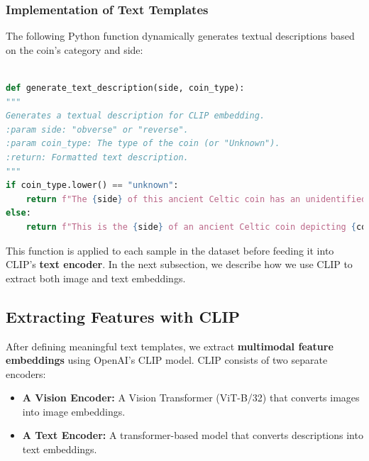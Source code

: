 \documentclass[nolibertine, english, algorithm, nomencl, minted]{ttlab-qualify}
\begin{document}
\subsubsection{Implementation of Text Templates}

The following Python function dynamically generates textual descriptions based on the coin’s category and side:

\begin{footnotesize}
\begin{center}
\begin{tcolorbox}[colback=gray!10, colframe=black, arc=5mm]
\begin{lstlisting}[language=Python, breaklines=true]

def generate_text_description(side, coin_type):
"""
Generates a textual description for CLIP embedding.
:param side: "obverse" or "reverse".
:param coin_type: The type of the coin (or "Unknown").
:return: Formatted text description.
"""
if coin_type.lower() == "unknown":
    return f"The {side} of this ancient Celtic coin has an unidentified design."
else:
    return f"This is the {side} of an ancient Celtic coin depicting {coin_type}."

\end{lstlisting}
\end{tcolorbox}
\end{center}
\end{footnotesize}

This function is applied to each sample in the dataset before feeding it into CLIP’s \textbf{text encoder}. 
In the next subsection, we describe how we use CLIP to extract both image and text embeddings.

\subsection{Extracting Features with CLIP}

After defining meaningful text templates, we extract \textbf{multimodal feature embeddings} using OpenAI’s CLIP model. 
CLIP consists of two separate encoders:
\begin{itemize}
    \item \textbf{A Vision Encoder:} A Vision Transformer (ViT-B/32) that converts images into image embeddings.
    \item \textbf{A Text Encoder:} A transformer-based model that converts descriptions into text embeddings.
\end{itemize}
\end{document}
